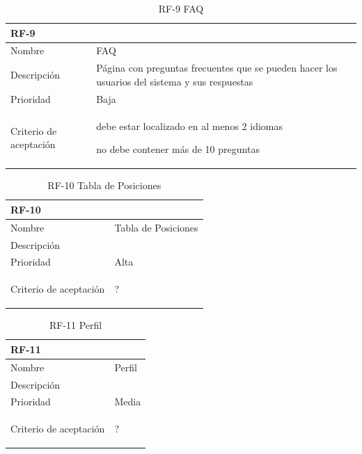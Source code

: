 \documentclass[11pt,spanish,listoffigures,listoftables]{tfgetsinf}
\begin{document}
\begin{table}
	\centering
	\begin{tabular}{ |p{4cm}||p{10cm}|  }
		\multicolumn{2}{l}{\textbf{RF-9}} \\
		\hline
		Nombre   & FAQ \\
		\hline
		Descripción  & Página con preguntas frecuentes que se pueden hacer los usuarios del sistema y sus respuestas  \\
		\hline
		Prioridad &  Baja\\
		\hline
		Criterio de aceptación & 
		\begin{tabitem}
			\item debe estar localizado en al menos 2 idiomas
			\item no debe contener más de 10 preguntas
		\end{tabitem} \\
		\hline
	\end{tabular}
	\caption{RF-9 FAQ}
	\label{table:9}
\end{table}

\begin{table}
	\centering
	\begin{tabular}{ |p{4cm}||p{10cm}|  }
		\multicolumn{2}{l}{\textbf{RF-10}} \\
		\hline
		Nombre & Tabla de Posiciones \\
		\hline
		Descripción &  \\
		\hline
		Prioridad & Alta\\
		\hline
		Criterio de aceptación & 
		\begin{tabitem}
			\item ?
		\end{tabitem} \\
		\hline
	\end{tabular}
	\caption{RF-10 Tabla de Posiciones}
	\label{table:10}
\end{table}

\begin{table}
	\centering
	\begin{tabular}{ |p{4cm}||p{10cm}|  }
		\multicolumn{2}{l}{\textbf{RF-11}} \\
		\hline
		Nombre & Perfil \\
		\hline
		Descripción &  \\
		\hline
		Prioridad & Media\\
		\hline
		Criterio de aceptación & 
		\begin{tabitem}
			\item ?
		\end{tabitem} \\
		\hline
	\end{tabular}
	\caption{RF-11 Perfil}
	\label{table:11}
\end{table}
\end{document}
